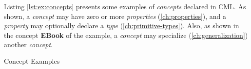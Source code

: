 Listing \ref{lst:ex:concepts} presents some examples of \emph{concepts} declared in CML.
As shown,
a \emph{concept} may have zero or more \emph{properties}
(\ref{ch:properties}),
and a \emph{property} may optionally declare a \emph{type}
(\ref{ch:primitive-types}).
Also, as shown in the concept \textbf{EBook} of the example,
a \emph{concept} may specialize
(\ref{ch:generalization})
another \emph{concept}.

\begin{code}
\verbatimfont{\small}

\caption{Concept Examples}
\label{lst:ex:concepts}
\end{code}
